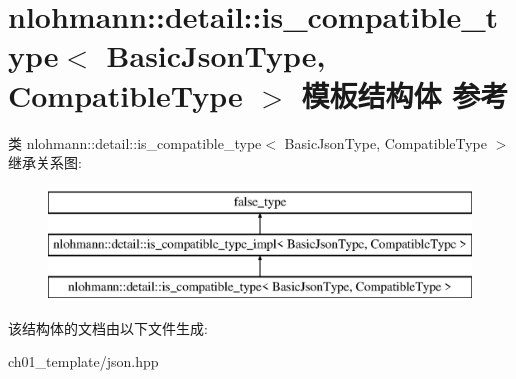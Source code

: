 \hypertarget{structnlohmann_1_1detail_1_1is__compatible__type}{}\section{nlohmann\+::detail\+::is\+\_\+compatible\+\_\+type$<$ Basic\+Json\+Type, Compatible\+Type $>$ 模板结构体 参考}
\label{structnlohmann_1_1detail_1_1is__compatible__type}
类 nlohmann\+::detail\+::is\+\_\+compatible\+\_\+type$<$ Basic\+Json\+Type, Compatible\+Type $>$ 继承关系图\+:\begin{figure}[H]
\begin{center}
\leavevmode
\includegraphics[height=3.000000cm]{structnlohmann_1_1detail_1_1is__compatible__type}
\end{center}
\end{figure}


该结构体的文档由以下文件生成\+:\begin{DoxyCompactItemize}
\item 
ch01\+\_\+template/json.\+hpp\end{DoxyCompactItemize}

